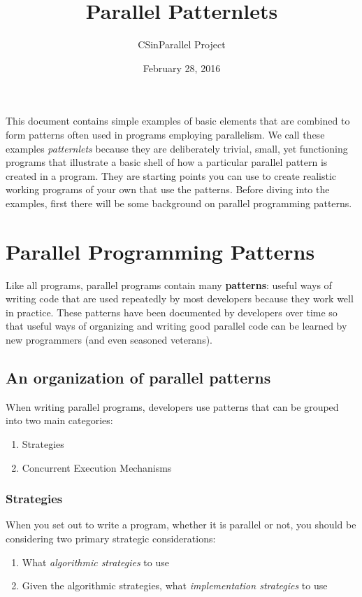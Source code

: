 \documentclass[letterpaper,10pt,openany,oneside]{sphinxmanual}
\title{Parallel Patternlets}
\date{February 28, 2016}
\author{CSinParallel Project}
\begin{document}
\maketitle
\tableofcontents
{}\label{index::doc}


This document contains simple examples of basic elements that are combined to form patterns often used in programs employing parallelism.  We call these examples \emph{patternlets} because they are deliberately trivial, small, yet functioning programs that illustrate a basic shell of how a particular parallel pattern is created in a program.  They are starting points you can use to create realistic working programs of your own that use the patterns.  Before diving into the examples, first there will be some background on parallel programming patterns.


\chapter{Parallel Programming Patterns}
\label{PatternsIntro:parallel-programming-patterns}\label{PatternsIntro::doc}\label{PatternsIntro:parallel-patternlets}
Like all programs, parallel programs contain many \textbf{patterns}: useful ways of writing code that are used repeatedly by most developers because they work well in practice.  These patterns have been documented by developers over time so that useful ways of organizing and writing good parallel code can be learned by new programmers (and even seasoned veterans).


\section{An organization of parallel patterns}
\label{PatternsIntro:an-organization-of-parallel-patterns}
When writing parallel programs, developers use patterns that can be grouped into two main categories:
\begin{enumerate}
\item {} 
Strategies

\item {} 
Concurrent Execution Mechanisms

\end{enumerate}


\subsection{Strategies}
\label{PatternsIntro:strategies}
When you set out to write a program, whether it is parallel or not, you should be considering two primary strategic considerations:
\begin{enumerate}
\item {} 
What \emph{algorithmic strategies} to use

\item {} 
Given the algorithmic strategies, what \emph{implementation strategies} to use

\end{enumerate}
\end{document}
